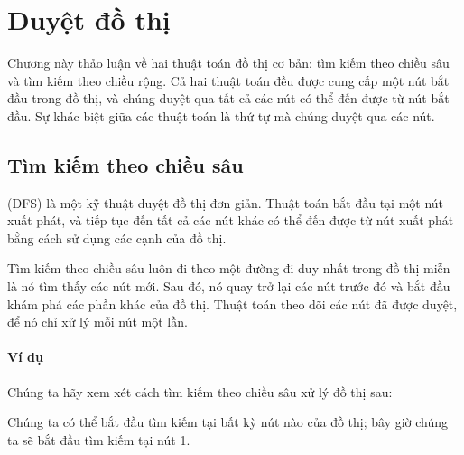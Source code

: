 \chapter{Duyệt đồ thị}

Chương này thảo luận về hai thuật toán đồ thị
cơ bản:
tìm kiếm theo chiều sâu và tìm kiếm theo chiều rộng.
Cả hai thuật toán đều được cung cấp một nút bắt đầu
trong đồ thị,
và chúng duyệt qua tất cả các nút có thể đến được
từ nút bắt đầu.
Sự khác biệt giữa các thuật toán là thứ tự
mà chúng duyệt qua các nút.

\section{Tìm kiếm theo chiều sâu}


 (DFS)
là một kỹ thuật duyệt đồ thị đơn giản.
Thuật toán bắt đầu tại một nút xuất phát,
và tiếp tục đến tất cả các nút khác có thể
đến được từ nút xuất phát bằng cách sử dụng
các cạnh của đồ thị.

Tìm kiếm theo chiều sâu luôn đi theo một
đường đi duy nhất trong đồ thị miễn là nó tìm thấy
các nút mới.
Sau đó, nó quay trở lại các
nút trước đó và bắt đầu khám phá các phần khác của đồ thị.
Thuật toán theo dõi các nút đã được duyệt,
để nó chỉ xử lý mỗi nút một lần.

\subsubsection*{Ví dụ}

Chúng ta hãy xem xét cách tìm kiếm theo chiều sâu xử lý
đồ thị sau:
\begin{center}
\end{center}
Chúng ta có thể bắt đầu tìm kiếm tại bất kỳ nút nào của đồ thị;
bây giờ chúng ta sẽ bắt đầu tìm kiếm tại nút 1.


